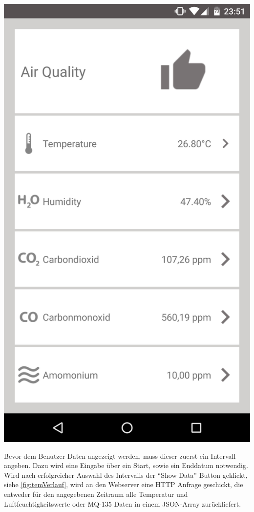 \begin{minipage}[c]{0.5\textwidth}
	\centering
	\includegraphics[scale=0.1]{images/airQuality}
	\label{label:airquality}
\end{minipage}

Bevor dem Benutzer Daten angezeigt werden, muss dieser zuerst ein Intervall angeben. Dazu wird eine Eingabe über ein Start, sowie ein Enddatum notwendig. Wird nach erfolgreicher Auswahl des Intervalls der \enquote{Show Data} Button geklickt, siehe \autoref{fig:temVerlauf}, wird an den Webserver eine \ac{HTTP} Anfrage geschickt, die entweder für den angegebenen Zeitraum alle Temperatur und Luftfeuchtigkeitswerte oder MQ-135 Daten in einem \ac{JSON}-Array zurückliefert. 


